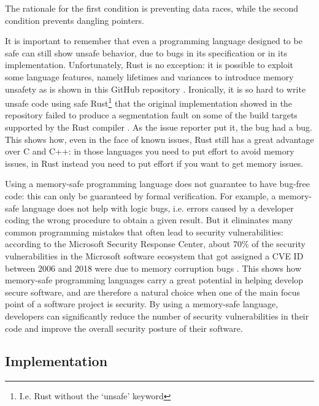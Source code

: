 \documentclass{report}
\begin{document}
The rationale for the first condition is preventing data races, while the second condition prevents dangling pointers. \par
It is important to remember that even a programming language designed to be safe can still show unsafe behavior, due to bugs in its specification or in its implementation.
Unfortunately, Rust is no exception: it is possible to exploit some language features, namely lifetimes \cite{rust-lifetimes} and variances \cite{rust-variances} to introduce
memory unsafety as is shown in this GitHub repository \cite{cve-rs}. Ironically, it is so hard to write unsafe code using safe Rust\footnote{I.e. Rust without the \enquote*{unsafe}
keyword} that the original implementation showed in the repository failed to produce a segmentation fault on some of the build targets supported by the Rust compiler
\cite{cve-rs-bug}. As the issue reporter put it, the bug had a bug. This shows how, even in the face of known issues, Rust still has a great advantage over C and C++: in those
languages you need to put effort to avoid memory issues, in Rust instead you need to put effort if you want to get memory issues. \par
Using a memory-safe programming language does not guarantee to have bug-free code: this can only be guaranteed by formal verification. For example, a memory-safe language does not
help with logic bugs, i.e. errors caused by a developer coding the wrong procedure to obtain a given result. But it eliminates many common programming
mistakes that often lead to security vulnerabilities: according to the Microsoft Security Response Center, about 70\% of the security vulnerabilities in the Microsoft software
ecosystem that got assigned a CVE ID \cite{cve_id} between 2006 and 2018 were due to memory corruption bugs \cite{proactive_approach_to_safety}. This shows how memory-safe programming 
languages carry a great potential in helping develop secure software, and are therefore a natural choice when one of the main focus point of a software project is security. By
using a memory-safe language, developers can significantly reduce the number of security vulnerabilities in their code and improve the overall security posture of their software. 


\subsection{Implementation}\label{failed_implementation}
\end{document}
